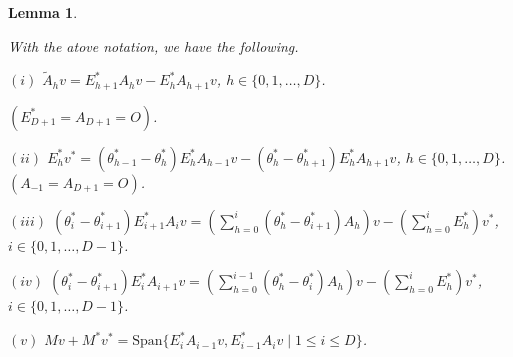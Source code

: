\documentclass[
]{book}
\newtheorem{lemma}{Lemma}[chapter]
\theoremstyle{definition}
\theoremstyle{definition}
\theoremstyle{definition}
\theoremstyle{definition}
\theoremstyle{remark}
\begin{document}
\begin{lemma}
\protect\hypertarget{lem:mvplusmstarvstar}{}\label{lem:mvplusmstarvstar}

With the atove notation, we have the following.

\((i)\) \(\tilde{A}_hv = E^*_{h+1}A_hv - E^*_hA_{h+1}v\), \(h\in \{0, 1, \ldots, D\}\).

\((E^*_{D+1} = A_{D+1} = O)\).

\((ii)\) \(E^*_hv^* = (\theta^*_{h-1}-\theta^*_h)E^*_hA_{h-1}v - (\theta^*_h-\theta^*_{h+1})E^*_hA_{h+1}v\), \(h\in \{0, 1, \ldots, D\}\). \((A_{-1} = A_{D+1} = O)\).

\((iii)\) \({\displaystyle (\theta^*_i-\theta^*_{i+1})E^*_{i+1}A_iv = \left(\sum_{h=0}^i (\theta^*_h-\theta^*_{i+1})A_h\right)v - \left(\sum_{h=0}^i E^*_h\right)v^*}\), \(i\in \{0,1, \ldots, D-1\}\).

\((iv)\) \({\displaystyle (\theta^*_i-\theta^*_{i+1})E^*_{i}A_{i+1}v = \left(\sum_{h=0}^{i-1}(\theta^*_h-\theta^*_{i})A_h\right)v - \left(\sum_{h=0}^i E^*_h\right)v^*}\), \(i\in \{0,1, \ldots, D-1\}\).

\((v)\) \(Mv + M^*v^* = \mathrm{Span}\{E^*_iA_{i-1}v, E^*_{i-1}A_iv \mid 1\leq i\leq D\}\).

\end{lemma}
\end{document}
